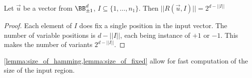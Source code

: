 \begin{lemma}{Let $\vec u$ be a vector from $\BB^{d}_{\pm 1}$, $I\subseteq \{1,\ldots,n_1\}$.
    Then $||R(\vec u, I)|| = 2^{d-||I||}$}%
    \label{lemma:size_of_fixed}%
    \begin{proof}
        Each element of $I$ does fix a single position in the input vector.
        The number of variable positions is $d-||I||$, each being instance of
        $+1$ or $-1$. This makes the number of variants $2^{d-||I||}$.
    \end{proof}
\end{lemma}

\begin{remark}
    \cref{lemma:size_of_hamming,lemma:size_of_fixed}
    allow for fast computation of the size of the input region.
\end{remark}

